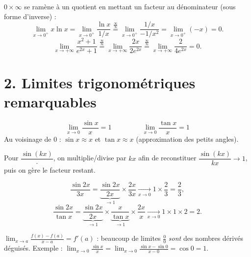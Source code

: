 \documentclass[11pt,a4paper]{article}
\begin{document}
\begin{exemple}
$0\times\infty$ se ramène à un quotient en mettant un facteur au dénominateur (sous forme d'inverse) :
\[ \lim_{x\to 0^+} x\ln x=\lim_{x\to 0^+}\frac{\ln x}{1/x}\overset{\frac{\infty}{\infty}}{=}\lim_{x\to0^+}\frac{1/x}{-1/x^2}=\lim_{x\to0^+}(-x)=0. \]
\[ \lim_{x\to+\infty}\frac{x^2+1}{e^{2x}+1}\overset{\frac{\infty}{\infty}}{=}\lim_{x\to+\infty}\frac{2x}{2e^{2x}}\overset{\frac{\infty}{\infty}}{=}\lim_{x\to+\infty}\frac{2}{4e^{2x}}=0. \]
\end{exemple}

\section{2. Limites trigonométriques remarquables}

\begin{idee}
\[ \boxed{\ \lim_{x\to 0}\frac{\sin x}{x}=1\ }\qquad\qquad \boxed{\ \lim_{x\to 0}\frac{\tan x}{x}=1\ } \]
Au voisinage de $0$ : $\sin x\approx x$ et $\tan x\approx x$ (approximation des petits angles).
\end{idee}

\begin{methode}
Pour $\dfrac{\sin(kx)}{\,\cdot\,}$, on multiplie/divise par $kx$ afin de reconstituer
$\dfrac{\sin(kx)}{kx}\to 1$, puis on gère le facteur restant.
\end{methode}

\begin{exemple}
\[ \frac{\sin 2x}{3x}=\underbrace{\frac{\sin 2x}{2x}}_{\to 1}\times\frac{2x}{3x}\xrightarrow[x\to0]{}1\times\frac23=\frac23, \]
\[ \frac{\sin 2x}{\tan x}=\underbrace{\frac{\sin 2x}{2x}}_{\to 1}\times\underbrace{\frac{x}{\tan x}}_{\to 1}\times\frac{2x}{x}\xrightarrow[x\to0]{}1\times1\times2=2. \]
\end{exemple}

\begin{astuce}[une limite $=$ un nombre dérivé]
$\displaystyle\lim_{x\to a}\frac{f(x)-f(a)}{x-a}=f'(a)$ : beaucoup de limites $\frac00$ \emph{sont}
des nombres dérivés déguisés. Exemple : $\displaystyle\lim_{x\to 0}\frac{\sin x}{x}=\lim_{x\to0}\frac{\sin x-\sin 0}{x-0}=\cos 0=1$.
\end{astuce}
\end{document}
